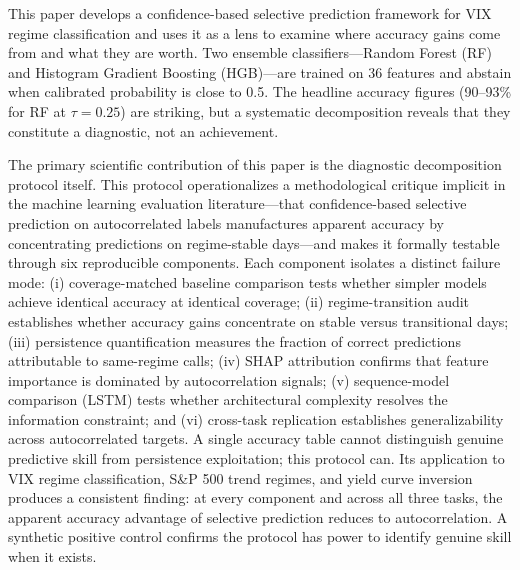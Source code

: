 \documentclass[11pt]{article}
\begin{document}
This paper develops a confidence-based selective prediction framework for VIX regime classification and uses it as a lens to examine where accuracy gains come from and what they are worth. Two ensemble classifiers---Random Forest (RF) and Histogram Gradient Boosting (HGB)---are trained on 36 features and abstain when calibrated probability is close to 0.5. The headline accuracy figures (90--93\% for RF at $\tau = 0.25$) are striking, but a systematic decomposition reveals that they constitute a diagnostic, not an achievement.

The primary scientific contribution of this paper is the diagnostic decomposition protocol itself. This protocol operationalizes a methodological critique implicit in the machine learning evaluation literature---that confidence-based selective prediction on autocorrelated labels manufactures apparent accuracy by concentrating predictions on regime-stable days---and makes it formally testable through six reproducible components. Each component isolates a distinct failure mode: (i) coverage-matched baseline comparison tests whether simpler models achieve identical accuracy at identical coverage; (ii) regime-transition audit establishes whether accuracy gains concentrate on stable versus transitional days; (iii) persistence quantification measures the fraction of correct predictions attributable to same-regime calls; (iv) SHAP attribution confirms that feature importance is dominated by autocorrelation signals; (v) sequence-model comparison (LSTM) tests whether architectural complexity resolves the information constraint; and (vi) cross-task replication establishes generalizability across autocorrelated targets. A single accuracy table cannot distinguish genuine predictive skill from persistence exploitation; this protocol can. Its application to VIX regime classification, S\&P 500 trend regimes, and yield curve inversion produces a consistent finding: at every component and across all three tasks, the apparent accuracy advantage of selective prediction reduces to autocorrelation. A synthetic positive control confirms the protocol has power to identify genuine skill when it exists.
\end{document}
